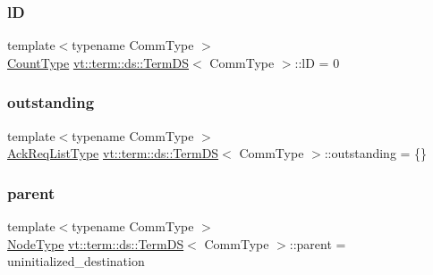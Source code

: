 \subsubsection{\texorpdfstring{lD}{lD}}
{\footnotesize\ttfamily template$<$typename Comm\+Type $>$ \\
\hyperlink{structvt_1_1term_1_1ds_1_1_term_d_s_a54f4ebd7e1ecb59c32c0f5b03ef9f20b}{Count\+Type} \hyperlink{structvt_1_1term_1_1ds_1_1_term_d_s}{vt\+::term\+::ds\+::\+Term\+DS}$<$ Comm\+Type $>$\+::lD = 0\hspace{0.3cm}{\ttfamily [protected]}}

\mbox{\label{structvt_1_1term_1_1ds_1_1_term_d_s_a345a64aa827f72e541f9725f7ea2cbf8}} 
\subsubsection{\texorpdfstring{outstanding}{outstanding}}
{\footnotesize\ttfamily template$<$typename Comm\+Type $>$ \\
\hyperlink{structvt_1_1term_1_1ds_1_1_term_d_s_a9d4102aa0577c3b077befc48c1a88842}{Ack\+Req\+List\+Type} \hyperlink{structvt_1_1term_1_1ds_1_1_term_d_s}{vt\+::term\+::ds\+::\+Term\+DS}$<$ Comm\+Type $>$\+::outstanding = \{\}\hspace{0.3cm}{\ttfamily [protected]}}

\mbox{\label{structvt_1_1term_1_1ds_1_1_term_d_s_a904c12ccc672c4849af1cc6e89a91c54}} 
\subsubsection{\texorpdfstring{parent}{parent}}
{\footnotesize\ttfamily template$<$typename Comm\+Type $>$ \\
\hyperlink{namespacevt_a866da9d0efc19c0a1ce79e9e492f47e2}{Node\+Type} \hyperlink{structvt_1_1term_1_1ds_1_1_term_d_s}{vt\+::term\+::ds\+::\+Term\+DS}$<$ Comm\+Type $>$\+::parent = uninitialized\+\_\+destination\hspace{0.3cm}{\ttfamily [protected]}}

